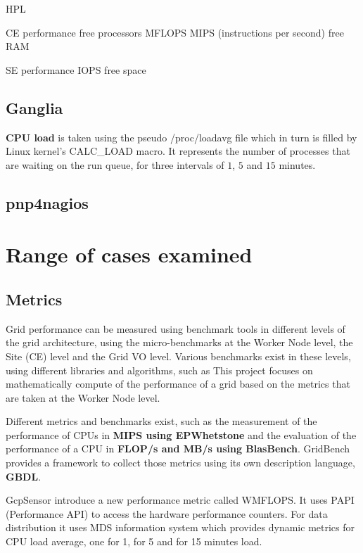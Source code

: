 HPL
\cite{gridbench}

CE performance
free processors
MFLOPS
MIPS (instructions per second)
free RAM

SE performance
IOPS
free space
\subsection{Ganglia}

{\bf CPU load} is taken using the pseudo /proc/loadavg file which in turn is
filled by Linux kernel's CALC\_LOAD macro. It represents the number of processes
that are waiting on the run queue, for three intervals of $1$, $5$ and $15$ minutes.

\subsection{pnp4nagios}

\section{Range of cases examined}
\subsection{Metrics}

Grid performance can be measured using benchmark tools in different levels of
the grid architecture, using the micro-benchmarks at the Worker Node level, the
Site (CE) level and the Grid VO level. Various benchmarks exist in these
levels, using different libraries and algorithms, such as  This project focuses
on mathematically compute of the performance of a grid based on the metrics that
are taken at the Worker Node level.

Different metrics and benchmarks exist, such as the measurement of
the performance of CPUs in {\bf MIPS using EPWhetstone} and the evaluation of
the performance of a CPU in {\bf FLOP/s and MB/s using BlasBench}. GridBench
\cite{gridbench} provides a framework to collect those metrics using its own
description language, {\bf GBDL}.

GcpSensor \cite{gcpsensor} introduce a new performance metric called WMFLOPS. It
uses PAPI \cite{papi} (Performance API) to access the hardware performance
counters. For data distribution it uses MDS information system which provides
dynamic metrics for CPU load average, one for 1, for 5 and for 15 minutes load.

